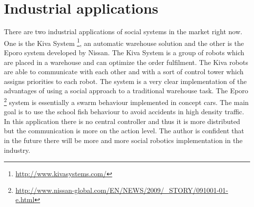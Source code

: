 \section{Industrial applications \label{Conclusion:Industrial}}

There are two industrial applications of social systems in the market right now.
One is the Kiva System \footnote{\url{http://www.kivasystems.com/}}, an automatic warehouse solution and the other is the Eporo system developed by Nissan.
The Kiva System is a group of robots which are placed in a warehouse and
can optimize the order fulfilment.
The Kiva robots are able to communicate with each other and with a sort
of control tower which assigns priorities to each robot.
The system is a very clear implementation of the advantages of using a
social approach to a traditional warehouse task.
The Eporo \footnote{\url{http://www.nissan-global.com/EN/NEWS/2009/_STORY/091001-01-e.html}} system is essentially a swarm behaviour implemented
in concept cars.
The main goal is to use the school fish behaviour to avoid accidents
in high density traffic. In this application there is no central controller
and thus it is more distributed but the communication is more on the action level.
The author is confident that in the future there will be more and more
social robotics implementation in the industry.
